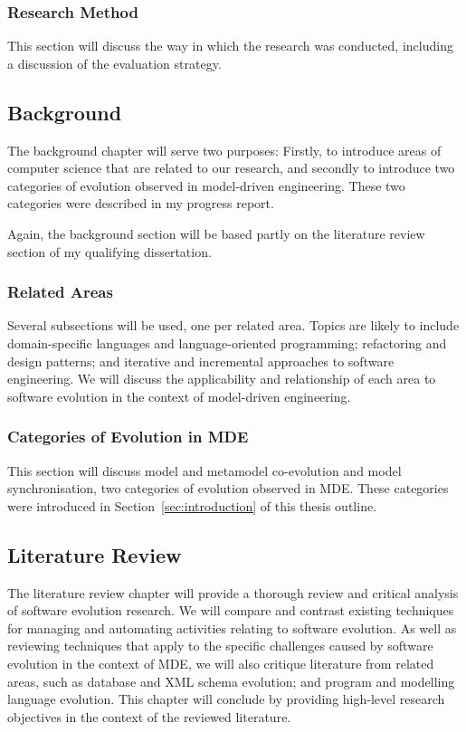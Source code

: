 \subsubsection{Research Method}
This section will discuss the way in which the research was conducted, including a discussion of the evaluation strategy.


\subsection{Background}
The background chapter will serve two purposes: Firstly, to introduce areas of computer science that are related to our research, and secondly to introduce two categories of evolution observed in model-driven engineering. These two categories were described in my progress report.

Again, the background section will be based partly on the literature review section of my qualifying dissertation.

\subsubsection{Related Areas}
Several subsections will be used, one per related area. Topics are likely to include domain-specific languages and language-oriented programming; refactoring and design patterns; and iterative and incremental approaches to software engineering. We will discuss the applicability and relationship of each area to software evolution in the context of model-driven engineering.

\subsubsection{Categories of Evolution in MDE}
This section will discuss model and metamodel co-evolution and model synchronisation, two categories of evolution observed in MDE. These categories were introduced in Section~\ref{sec:introduction} of this thesis outline.


\subsection{Literature Review}
The literature review chapter will provide a thorough review and critical analysis of software evolution research. We will compare and contrast existing techniques for managing and automating activities relating to software evolution. As well as reviewing techniques that apply to the specific challenges caused by software evolution in the context of MDE, we will also critique literature from related areas, such as database and XML schema evolution; and program and modelling language evolution. This chapter will conclude by providing high-level research objectives in the context of the reviewed literature.




